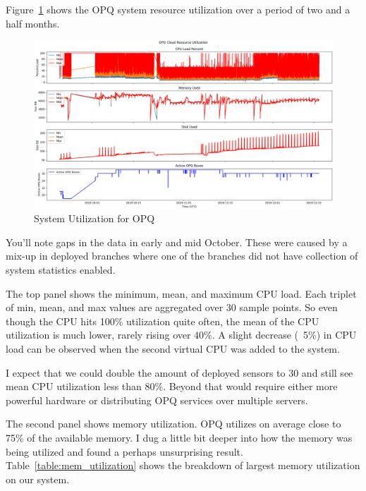 Figure~\ref{fig:actual_system_opq} shows the OPQ system resource utilization over a period of two and a half months.

\begin{figure}[H]
    \centering
    \includegraphics[width=\linewidth]{figures/actual_system_opq.png}
    \caption{System Utilization for OPQ}
    \label{fig:actual_system_opq}
\end{figure}

You'll note gaps in the data in early and mid October. These were caused by a mix-up in deployed branches where one of the branches did not have collection of system statistics enabled.

The top panel shows the minimum, mean, and maximum CPU load. Each triplet of min, mean, and max values are aggregated over 30 sample points. So even though the CPU hits 100\% utilization quite often, the mean of the CPU utilization is much lower, rarely rising over 40\%. A slight decrease (~5\%) in CPU load can be observed when the second virtual CPU was added to the system.

I expect that we could double the amount of deployed sensors to 30 and still see mean CPU utilization less than 80\%. Beyond that would require either more powerful hardware or distributing OPQ services over multiple servers.

The second panel shows memory utilization. OPQ utilizes on average close to 75\% of the available memory. I dug a little bit deeper into how the memory was being utilized and found a perhaps unsurprising result. Table~\ref{table:mem_utilization} shows the breakdown of largest memory utilization on our system.

